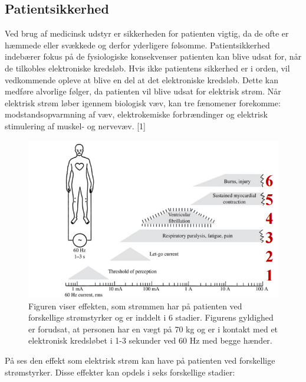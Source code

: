 \subsection{Patientsikkerhed}
Ved brug af medicinsk udstyr er sikkerheden for patienten vigtig, da de ofte er hæmmede eller svækkede og derfor yderligere følsomme. Patientsikkerhed indebærer fokus på de fysiologiske konsekvenser patienten kan blive udsat for, når de tilkobles elektroniske kredsløb. Hvis ikke patientens sikkerhed er i orden, vil vedkommende opleve at blive en del at det elektroniske kredsløb. Dette kan medføre alvorlige følger, da patienten vil blive udsat for elektrisk strøm. Når elektrisk strøm løber igennem biologisk væv, kan tre fænomener forekomme: modstandsopvarmning af væv, elektrokemiske forbrændinger og elektrisk stimulering af muskel- og nervevæv. [1] 
\begin{figure}[H]
	\centering
	\includegraphics[scale=0.5]{figures/bProblemanalyse/Patientsikkerhed.png}
	\caption{Figuren viser effekten, som strømmen har på patienten ved forskellige strømstyrker og er inddelt i 6 stadier. Figurens gyldighed er forudsat, at personen har en vægt på 70 kg og er i kontakt med et elektronisk kredsløbet i 1-3 sekunder ved 60 Hz med begge hænder. }
	\label{Patientsikkerhed}
\end{figure}

På  ses den effekt som elektrisk strøm kan have på patienten ved forskellige strømstyrker. Disse effekter kan opdels i seks forskellige stadier:

